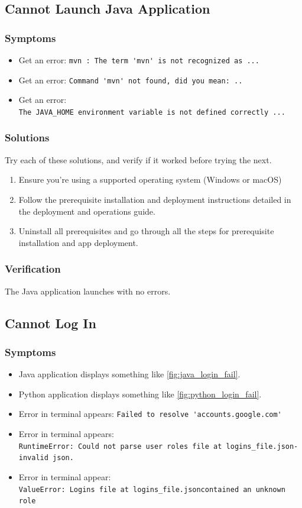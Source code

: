 \documentclass[11pt]{article}
\begin{document}
\subsection{Cannot Launch Java Application}
\subsubsection{Symptoms}
\begin{itemize}
  \item Get an error: \verb|mvn : The term 'mvn' is not recognized as ...|
  \item Get an error: \verb|Command 'mvn' not found, did you mean: ..|
  \item Get an error: \\\verb|The JAVA_HOME environment variable is not defined correctly ...|
\end{itemize}
\subsubsection{Solutions}
Try each of these solutions, and verify if it worked before trying the next.
\begin{enumerate}
  \item Ensure you're using a supported operating system (Windows or macOS)
  \item Follow the prerequisite installation and deployment instructions detailed in the deployment and operations guide.
  \item Uninstall all prerequisites and go through all the steps for prerequisite installation and app deployment.
\end{enumerate}

\subsubsection{Verification}
The Java application launches with no errors.

\subsection{Cannot Log In}
\subsubsection{Symptoms}
\begin{itemize}
  \item Java application displays something like \ref{fig:java_login_fail}.
  \item Python application displays something like \ref{fig:python_login_fail}.
  \item Error in terminal appears: \verb|Failed to resolve 'accounts.google.com'|
  \item Error in terminal appears:\\\verb|RuntimeError: Could not parse user roles file at logins_file.json- invalid json.|
  \item Error in terminal appear: \\\verb|ValueError: Logins file at logins_file.jsoncontained an unknown role|
\end{itemize}
\end{document}
